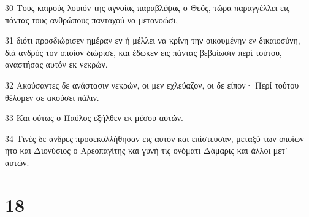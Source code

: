 \par 30 Τους καιρούς λοιπόν της αγνοίας παραβλέψας ο Θεός, τώρα παραγγέλλει εις πάντας τους ανθρώπους πανταχού να μετανοώσι,
\par 31 διότι προσδιώρισεν ημέραν εν ή μέλλει να κρίνη την οικουμένην εν δικαιοσύνη, διά ανδρός τον οποίον διώρισε, και έδωκεν εις πάντας βεβαίωσιν περί τούτου, αναστήσας αυτόν εκ νεκρών.
\par 32 Ακούσαντες δε ανάστασιν νεκρών, οι μεν εχλεύαζον, οι δε είπον· Περί τούτου θέλομεν σε ακούσει πάλιν.
\par 33 Και ούτως ο Παύλος εξήλθεν εκ μέσου αυτών.
\par 34 Τινές δε άνδρες προσεκολλήθησαν εις αυτόν και επίστευσαν, μεταξύ των οποίων ήτο και Διονύσιος ο Αρεοπαγίτης και γυνή τις ονόματι Δάμαρις και άλλοι μετ' αυτών.

\chapter{18}

